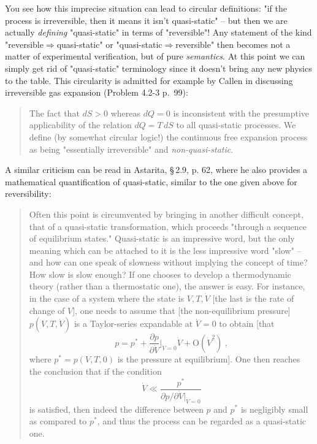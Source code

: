 \documentclass[a4paper,12pt,%
onecolumn,oneside,titlepage,%
british%
]{memoir}
\renewcommand*{\|}[1][]{\nonscript\:#1\vert\nonscript\:\mathopen{}}
\newcommand*{\sect}{\S}%
\begin{document}
You see how this imprecise situation can lead to circular definitions: "if the process is irreversible, then it means it isn't quasi-static" -- but then we are actually \emph{defining} "quasi-static" in terms of "reversible"! Any statement of the kind "reversible${}\Rightarrow{}$quasi-static" or "quasi-static${}\Rightarrow{}$reversible" then becomes not a matter of experimental verification, but of pure \emph{semantics}. At this point we can simply get rid of "quasi-static" terminology since it doesn't bring any new physics to the table. This circularity is admitted for example by Callen in discussing irreversible gas expansion (Problem 4.2-3 p.~99):

\begin{quote}
  The fact that $dS > 0$ whereas $dQ = 0$ is inconsistent with the presumptive applicability of the relation $dQ = T\,dS$ to all quasi-static processes. We define (by somewhat circular logic!) the continuous free expansion process as being "essentially irreversible" and \emph{non-quasi-static}.
\end{quote}

A similar criticism can be read in Astarita, \sect\,2.9, p. 62, where he also provides a mathematical quantification of quasi-static, similar to the one given above for reversibility:

\begin{quote}
  Often this point is circumvented by bringing in another difficult concept,
  that of a quasi-static transformation, which proceeds "through a sequence of
  equilibrium states." Quasi-static is an impressive word, but the only meaning
  which can be attached to it is the less impressive word "slow" -- and how can
  one speak of slowness without implying the concept of time? How slow is slow
  enough? If one chooses to develop a thermodynamic theory (rather than a
  thermostatic one), the answer is easy. For instance, in the case of a system where
  the state is $V, T, \dot{V}$ [the last is the rate of change of $V$], one needs to assume that [the non-equilibrium pressure] $p(V,T,\dot{V})$ is a Taylor-series expandable
  at $\dot{V} = 0$ to obtain [that
  $$
  p = p^* + \frac{\partial p}{\partial \dot{V}}\biggl\lvert_{\dot{V}=0}\dot{V} + \mathrm{O}(\dot{V}^2) \ ,
  $$
  where $p^* = p(V,T,0)$ is the pressure at equilibrium]. One then reaches the conclusion that if the
  condition
  $$\dot{V} \ll \frac{p^*}{\partial p/\partial \dot{V}\lvert_{\dot{V}=0}}
  $$
  is satisfied, then indeed the difference between $p$ and $p^*$ is negligibly small as compared to $p^*$, and thus the process can be regarded as a quasi-static one.
\end{quote}
\end{document}
